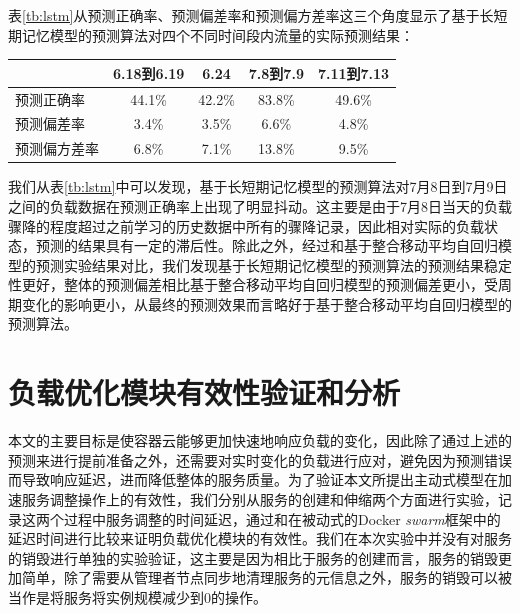 表\ref{tb:lstm}从预测正确率、预测偏差率和预测偏方差率这三个角度显示了基于长短期记忆模型的预测算法对四个不同时间段内流量的实际预测结果：
\begin{table}[h]
\centering
{}
\begin{tabular}{@{}lcccc@{}}\toprule
  & 6.18到6.19 & 6.24 & 7.8到7.9 & 7.11到7.13 \\ \midrule
 预测正确率 & 44.1\% & 42.2\% & 83.8\% & 49.6\% \\
 预测偏差率 & 3.4\% & 3.5\% & 6.6\% & 4.8\% \\
 预测偏方差率 & 6.8\% & 7.1\% & 13.8\% & 9.5\% \\ \bottomrule
\end{tabular}
\end{table}

我们从表\ref{tb:lstm}中可以发现，基于长短期记忆模型的预测算法对7月8日到7月9日之间的负载数据在预测正确率上出现了明显抖动。这主要是由于7月8日当天的负载骤降的程度超过之前学习的历史数据中所有的骤降记录，因此相对实际的负载状态，预测的结果具有一定的滞后性。除此之外，经过和基于整合移动平均自回归模型的预测实验结果对比，我们发现基于长短期记忆模型的预测算法的预测结果稳定性更好，整体的预测偏差相比基于整合移动平均自回归模型的预测偏差更小，受周期变化的影响更小，从最终的预测效果而言略好于基于整合移动平均自回归模型的预测算法。

\section{负载优化模块有效性验证和分析}
本文的主要目标是使容器云能够更加快速地响应负载的变化，因此除了通过上述的预测来进行提前准备之外，还需要对实时变化的负载进行应对，避免因为预测错误而导致响应延迟，进而降低整体的服务质量。为了验证本文所提出主动式模型在加速服务调整操作上的有效性，我们分别从服务的创建和伸缩两个方面进行实验，记录这两个过程中服务调整的时间延迟，通过和在被动式的Docker \emph{swarm}框架中的延迟时间进行比较来证明负载优化模块的有效性。我们在本次实验中并没有对服务的销毁进行单独的实验验证，这主要是因为相比于服务的创建而言，服务的销毁更加简单，除了需要从管理者节点同步地清理服务的元信息之外，服务的销毁可以被当作是将服务将实例规模减少到0的操作。

